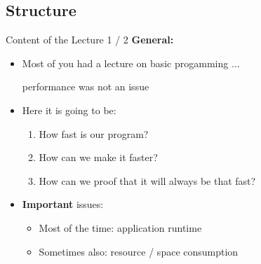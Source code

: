
\subsection{Structure}

\begin{frame}{Content of the Lecture 1 / 2}
  \textbf{General:}
  \begin{itemize}
    \item
      Most of you had a lecture on basic progamming $\ldots$
      \begin{center}\color{MainA}performance was not an issue\end{center}
      \vspace{1em}
    \item<2- | handout: 1>
      Here it is going to be:
      \begin{enumerate}
        \item<3- | handout: 1>
          How fast is our program?
        \item<4- | handout: 1>
          How can we make it faster?
        \item<5- | handout: 1>
          How can we proof that it will always be that fast?
      \end{enumerate}
      \vspace{1em}
    \item<6- |handout:1>
      \textbf{Important} issues:
      \begin{itemize}
        \item
          Most of the time: application {\color{MainA}runtime}
        \item
          Sometimes also: resource / {\color{MainA}space consumption}
      \end{itemize}
  \end{itemize}
\end{frame}


